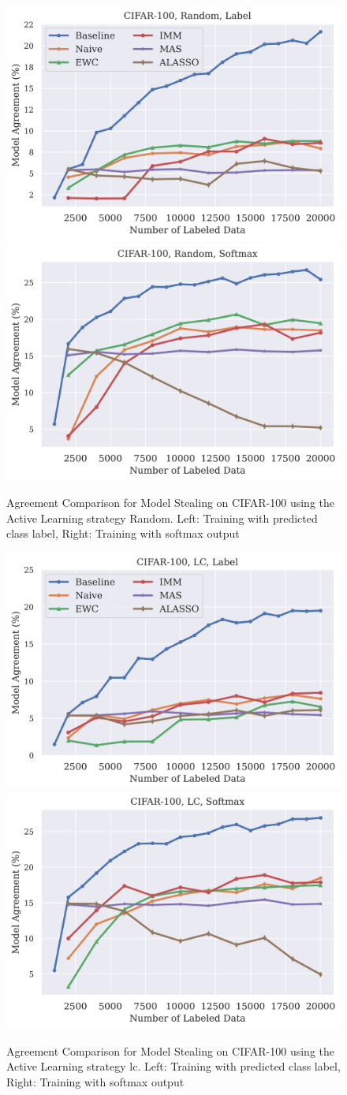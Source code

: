 \begin{figure}[!htb]
    \centering
    \includegraphics[width=0.48\linewidth]{images/results_CALMS/cifar100_label_random.png} \hfill
    \includegraphics[width=0.48\linewidth]{images/results_CALMS/cifar100_softmax_random.png}
    \caption{Agreement Comparison for Model Stealing on CIFAR-100 using the Active Learning strategy Random. Left: Training with predicted class label,
    Right: Training with softmax output}
    \label{fig:CALMSCIFAR100Random}
\end{figure}

\begin{figure}[!htb]
    \centering
    \includegraphics[width=0.48\linewidth]{images/results_CALMS/cifar100_label_lc.png} \hfill
    \includegraphics[width=0.48\linewidth]{images/results_CALMS/cifar100_softmax_lc.png}
    \caption{Agreement Comparison for Model Stealing on CIFAR-100 using the Active Learning strategy \gls{lc}. Left: Training with predicted class label,
    Right: Training with softmax output}
    \label{fig:CALMSCIFAR100LC}
\end{figure}

